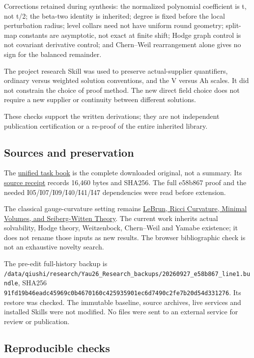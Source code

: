 \documentclass[
  10pt,
]{article}
\begin{document}
Corrections retained during synthesis: the normalized polynomial
coefficient is t, not t/2; the beta-two identity is inherited; degree is
fixed before the local perturbation radius; level collars need not have
uniform round geometry; split-map constants are asymptotic, not exact at
finite shift; Hodge graph control is not covariant derivative control;
and Chern--Weil rearrangement alone gives no sign for the balanced
remainder.

The project research Skill was used to preserve actual-supplier
quantifiers, ordinary versus weighted solution conventions, and the V
versus Ah scales. It did not constrain the choice of proof method. The
new direct field choice does not require a new supplier or continuity
between different solutions.

These checks support the written derivations; they are not independent
publication certification or a re-proof of the entire inherited library.

\hypertarget{sources-and-preservation}{%
\subsection{Sources and preservation}\label{sources-and-preservation}}

The
\href{../guidance/source/20260927_unified_research_directive.zh.md}{unified
task book} is the complete downloaded original, not a summary. Its
\href{../guidance/source/20260927_unified_directive_receipt.json}{source
receipt} records 16,460 bytes and SHA256. The full e58b867 proof and the
needed I05/I07/I09/I40/I41/I47 dependencies were read before extension.

The classical gauge-curvature setting remains
\href{https://arxiv.org/abs/math/0003068}{LeBrun, Ricci Curvature,
Minimal Volumes, and Seiberg-Witten Theory}. The current work inherits
actual solvability, Hodge theory, Weitzenbock, Chern--Weil and Yamabe
existence; it does not rename those inputs as new results. The browser
bibliographic check is not an exhaustive novelty search.

The pre-edit full-history backup is
\nolinkurl{/data/qiushi/research/Yau26_Research_backups/20260927_e58b867_line1.bundle},
SHA256
\nolinkurl{91fd19b46eadc45969c0b4670160c425935901ec6d7490c2fe7b20d54d331276}.
Its restore was checked. The immutable baseline, source archives, live
services and installed Skills were not modified. No files were sent to
an external service for review or publication.

\hypertarget{reproducible-checks}{%
\subsection{Reproducible checks}\label{reproducible-checks}}
\end{document}
